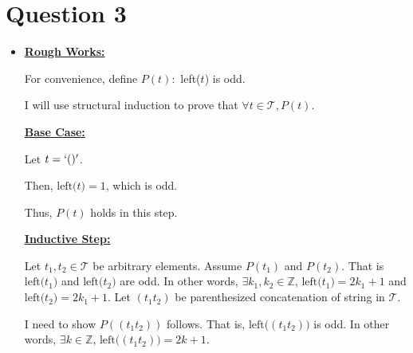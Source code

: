 \documentclass[12pt]{article}
\begin{document}
\bigskip

\section*{Question 3}

\bigskip

\begin{itemize}
    \item

    \begin{mdframed}
    \underline{\textbf{Rough Works:}}

    \bigskip

    For convenience, define $P(t):$ left($t$) is odd.

    \bigskip

    I will use structural induction to prove that $\forall t \in \mathcal{T}, P(t)$.

    \bigskip

    \underline{\textbf{Base Case:}}

    \bigskip

    Let $t = `()'$.

    \bigskip

    Then, $\text{left($t$)} = 1$, which is odd.

    \bigskip

    Thus, $P(t)$ holds in this step.

    \bigskip

    \underline{\textbf{Inductive Step:}}

    \bigskip

    Let $t_1, t_2 \in \mathcal{T}$ be arbitrary elements. Assume $P(t_1)$ and $P(t_2)$.
    That is $\text{left($t_1$)}$ and $\text{left($t_2$)}$ are odd. In other words,
    $\exists k_1,k_2 \in \mathbb{Z}$, $\text{left($t_1$)} = 2k_1 + 1$ and
    $\text{left($t_2$)} = 2k_1 + 1$. Let $(t_1t_2)$ be parenthesized concatenation
    of string in $\mathcal{T}$.

    \bigskip

    I need to show $P((t_1t_2))$ follows. That is, $\text{left($(t_1t_2)$)}$ is odd.
    In other words, $\exists k \in \mathbb{Z}$, $\text{left($(t_1t_2)$)} = 2k + 1$.

    \bigskip

    \end{mdframed}
\end{itemize}
\end{document}
